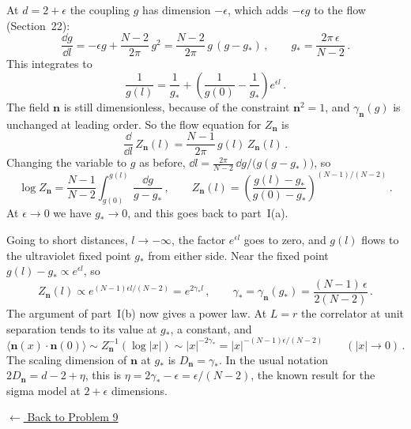  At $d=2+\epsilon$ the coupling $g$ has dimension $-\epsilon$, which
adds $-\epsilon g$ to the flow (Section~22):
\[
\frac{\dd g}{\dd l}=-\epsilon g+\frac{N-2}{2\pi}\,g^2=\frac{N-2}{2\pi}\,g\,(g-g_*)\,,\qquad g_*=\frac{2\pi\,\epsilon}{N-2}\,.
\]
This integrates to
\[
\frac1{g(l)}=\frac1{g_*}+\left(\frac1{g(0)}-\frac1{g_*}\right)e^{\epsilon l}\,.
\]
The field $\mathbf n$ is still dimensionless, because of the constraint
$\mathbf n^2=1$, and $\gamma_{\mathbf n}(g)$ is unchanged at leading order. So
the flow equation for $Z_{\mathbf n}$ is
\[
\frac{\dd}{\dd l}\,Z_{\mathbf n}(l)=\frac{N-1}{2\pi}\,g(l)\,Z_{\mathbf n}(l)\,.
\]
Changing the variable to $g$ as before,
$\dd l=\frac{2\pi}{N-2}\,\dd g/\bigl(g(g-g_*)\bigr)$, so
\[
\log Z_{\mathbf n}=\frac{N-1}{N-2}\int_{g(0)}^{g(l)}\frac{\dd g}{g-g_*}\,,\qquad
Z_{\mathbf n}(l)=\left(\frac{g(l)-g_*}{g(0)-g_*}\right)^{(N-1)/(N-2)}\,.
\]
At $\epsilon\to0$ we have $g_*\to0$, and this goes back to part~I(a).

Going to short distances, $l\to-\infty$, the factor $e^{\epsilon l}$ goes to
zero, and $g(l)$ flows to the ultraviolet fixed point $g_*$ from either side.
Near the fixed point $g(l)-g_*\propto e^{\epsilon l}$, so
\[
Z_{\mathbf n}(l)\propto e^{(N-1)\epsilon l/(N-2)}=e^{2\gamma_*l}\,,\qquad
\gamma_*=\gamma_{\mathbf n}(g_*)=\frac{(N-1)\,\epsilon}{2(N-2)}\,.
\]
The argument of part~I(b) now gives a power law. At $L=r$ the correlator at
unit separation tends to its value at $g_*$, a constant, and
\[
\bigl\langle\mathbf n(x)\cdot\mathbf n(0)\bigr\rangle\sim Z_{\mathbf n}^{-1}(\log|x|)\sim|x|^{-2\gamma_*}=|x|^{-(N-1)\epsilon/(N-2)}\qquad(|x|\to0)\,.
\]
The scaling dimension of $\mathbf n$ at $g_*$ is $D_{\mathbf n}=\gamma_*$. In the
usual notation $2D_{\mathbf n}=d-2+\eta$, this is
$\eta=2\gamma_*-\epsilon=\epsilon/(N-2)$, the known result for the sigma model
at $2+\epsilon$ dimensions.

\noindent\hyperref[hw:9]{$\leftarrow$ Back to Problem 9}
